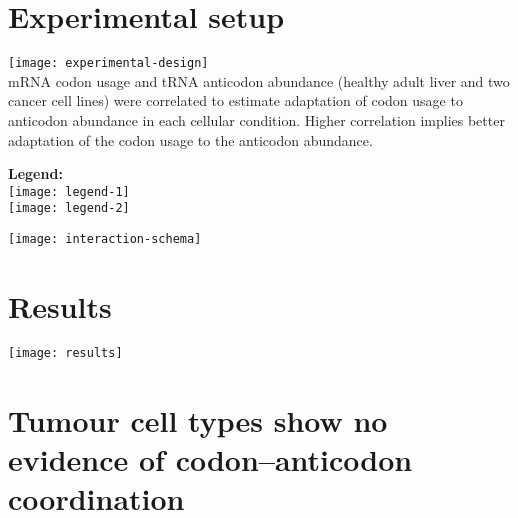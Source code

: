 \documentclass[a0,portrait]{a0poster}
\begin{document}
\begin{minipage}[][][t]{\textwidth}
    \section*{Experimental setup}
    \begin{minipage}[c]{0.50\textwidth}
        \texttt{[image: experimental-design]}
        \\[2cm]
        mRNA codon usage and tRNA anticodon abundance (healthy adult liver and
        two cancer cell lines) were correlated to estimate adaptation of codon
        usage to anticodon abundance in each cellular condition. Higher
        correlation implies better adaptation of the codon usage to the
        anticodon abundance.
    \end{minipage}%
    \hfill
    \begin{minipage}{0.20\textwidth}
        \centering
        \textbf{Legend:}\\[0.5cm]
        \texttt{[image: legend-1]}
        \\[2cm]
        \texttt{[image: legend-2]}
    \end{minipage}%
    \hfill
    \begin{minipage}{0.20\textwidth}
        \centering
        \texttt{[image: interaction-schema]}
    \end{minipage}%
\end{minipage}

\vspace{3cm}
\begin{minipage}{\textwidth}
    \begin{minipage}[t]{0.48\textwidth}
        \section*{Results}
        \texttt{[image: results]}
    \end{minipage}%
    \hfill%
    \begin{minipage}[t][][t]{0.48\textwidth}
        \section*{Tumour cell types show no evidence of codon--anticodon coordination}
    \end{minipage}%
\end{minipage}

\vspace{3cm}
\end{document}
